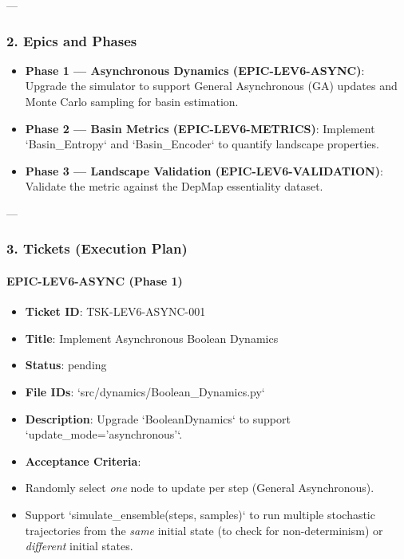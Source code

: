 \documentclass{article}
\begin{document}
---

\subsubsection{2. Epics and Phases}

\begin{itemize}
\item   \textbf{Phase 1 — Asynchronous Dynamics (EPIC-LEV6-ASYNC)}: Upgrade the simulator to support General Asynchronous (GA) updates and Monte Carlo sampling for basin estimation.
\item   \textbf{Phase 2 — Basin Metrics (EPIC-LEV6-METRICS)}: Implement `Basin\_Entropy` and `Basin\_Encoder` to quantify landscape properties.
\item   \textbf{Phase 3 — Landscape Validation (EPIC-LEV6-VALIDATION)}: Validate the metric against the DepMap essentiality dataset.
\end{itemize}

---

\subsubsection{3. Tickets (Execution Plan)}

\paragraph{EPIC-LEV6-ASYNC (Phase 1)}

\begin{itemize}
\item   \textbf{Ticket ID}: TSK-LEV6-ASYNC-001
\item   \textbf{Title}: Implement Asynchronous Boolean Dynamics
\item   \textbf{Status}: pending
\item   \textbf{File IDs}: `src/dynamics/Boolean\_Dynamics.py`
\item   \textbf{Description}: Upgrade `BooleanDynamics` to support `update\_mode='asynchronous'`.
\item   \textbf{Acceptance Criteria}:
\item   Randomly select \textit{one} node to update per step (General Asynchronous).
\item   Support `simulate\_ensemble(steps, samples)` to run multiple stochastic trajectories from the \textit{same} initial state (to check for non-determinism) or \textit{different} initial states.
\end{itemize}
\end{document}
